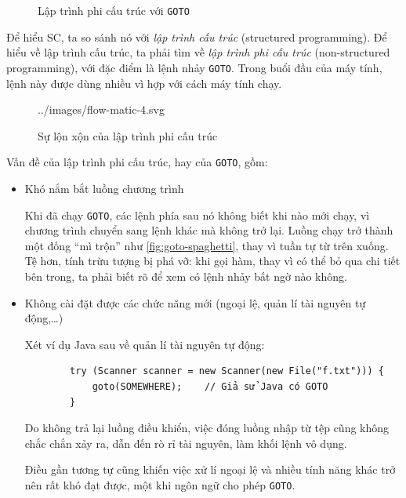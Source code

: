 \documentclass[../../thesis]{subfiles}
\begin{document}
\begin{figure}
    \centering
    \vspace*{-6mm}
    
    \vspace*{-10mm}    %
    \caption{Lập trình phi cấu trúc với \texttt{GOTO} \cite{NJS_SC}}
    \label{fig:non-structured-programming}
\end{figure}

Để hiểu SC, ta so sánh nó với \emph{lập trình cấu trúc} (structured
programming). Để hiểu về lập trình cấu trúc, ta phải tìm về \emph{lập trình phi
cấu trúc} (non-structured programming), với đặc điểm là lệnh nhảy \texttt{GOTO}.
Trong buổi đầu của máy tính, lệnh này được dùng nhiều vì hợp với cách máy tính
chạy.

\begin{figure}
    \centering
    
        {../images/flow-matic-4.svg}
    \caption{Sự lộn xộn của lập trình phi cấu trúc \cite{NJS_SC}}
    \label{fig:goto-spaghetti}
\end{figure}

Vấn đề của lập trình phi cấu trúc, hay của \texttt{GOTO}, gồm:

\begin{itemize}
    \item
        Khó nắm bắt luồng chương trình

        Khi đã chạy \texttt{GOTO}, các lệnh phía sau nó không biết khi nào mới
        chạy, vì chương trình chuyển sang lệnh khác mà không trở lại. Luồng chạy
        trở thành một đống ``mì trộn'' như \autoref{fig:goto-spaghetti}, thay vì
        tuần tự từ trên xuống. Tệ hơn, tính trừu tượng bị phá vỡ: khi gọi hàm,
        thay vì có thể bỏ qua chi tiết bên trong, ta phải biết rõ để xem có lệnh
        nhảy bất ngờ nào không.
\end{itemize}

\begin{itemize}[resume, before = \vspace*{-\dimexpr\topsep+\partopsep\relax}]
    \item
        Không cài đặt được các chức năng mới (ngoại lệ, quản lí tài nguyên tự
        động,\ldots)

        Xét ví dụ Java sau về quản lí tài nguyên tự động:

        \begin{verbatim}
        try (Scanner scanner = new Scanner(new File("f.txt"))) {
            goto(SOMEWHERE);    // Giả sử Java có GOTO
        }
        \end{verbatim}

        Do không trả lại luồng điều khiển, việc đóng luồng nhập từ tệp cũng
        không chắc chắn xảy ra, dẫn đến rò rỉ tài nguyên, làm khối lệnh vô dụng.

        Điều gần tương tự cũng khiến việc xử lí ngoại lệ và nhiều tính năng khác
        trở nên rất khó đạt được, một khi ngôn ngữ cho phép \texttt{GOTO}.
\end{itemize}
\end{document}
